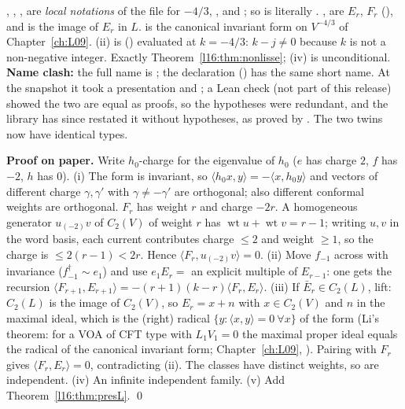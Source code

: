 \begin{dictionary}
, , ,  are \emph{local notations} of the file for $-4/3$, ,
\allowbreak{} and ; so \allowbreak{}\allowbreak{} is literally
. ,  are $E_r$, $F_r$
(), and  is the image of $E_r$ in $L$.  is the
canonical invariant form on $V^{-4/3}$ of Chapter~\ref{ch:L09}. (ii) is \allowbreak{}
() evaluated at $k=-4/3$: $k-j\ne0$ because $k$ is not a non-negative integer. Exactly
Theorem~\ref{l16:thm:nonlisse}; (iv) is unconditional. \textbf{Name clash:} the full name is
\allowbreak{}\allowbreak{}; the declaration \allowbreak{}\allowbreak{}
() has the same short name. At the snapshot it took a presentation  and
; a Lean check (not part of this release) showed the two are equal as proofs, so the hypotheses were redundant, and the
library has since restated it without hypotheses, as  proved by
. The two twins now have identical types.
\end{dictionary}

\textbf{Proof on paper.} Write $h_0$-charge for the eigenvalue of $h_0$ ($e$ has charge $2$, $f$ has $-2$, $h$ has $0$). (i) The
form is invariant, so $\langle h_0x,y\rangle = -\langle x,h_0y\rangle$ and vectors of different charge $\gamma,\gamma'$ with
$\gamma\ne-\gamma'$ are orthogonal; also different conformal weights are orthogonal. $F_r$ has weight $r$ and charge $-2r$. A
homogeneous generator $u_{(-2)}v$ of $C_2(V)$ of weight $r$ has $\operatorname{wt}u + \operatorname{wt}v = r-1$; writing $u,v$ in
the word basis, each current contributes charge $\le2$ and weight $\ge1$, so the charge is $\le2(r-1)<2r$. Hence
$\langle F_r,u_{(-2)}v\rangle = 0$. (ii) Move $f_{-1}$ across with invariance ($f_{-1}^\dagger\sim e_1$) and use
$e_1E_{r} = $ an explicit multiple of $E_{r-1}$: one gets the recursion $\langle F_{r+1},E_{r+1}\rangle =
-(r+1)(k-r)\langle F_r,E_r\rangle$. (iii) If $\bar E_r\in C_2(L)$, lift: $C_2(L)$ is the image of $C_2(V)$, so $E_r = x+n$ with $x\in
C_2(V)$ and $n$ in the maximal ideal, which is the (right) radical $\{y : \langle x,y\rangle = 0\ \forall x\}$ of the form (Li's theorem: for a VOA of CFT type with
$L_1V_1=0$ the maximal proper ideal equals the radical of the canonical invariant form; Chapter~\ref{ch:L09},
\allowbreak{}\allowbreak{}). Pairing
with $F_r$ gives $\langle F_r,E_r\rangle = 0$, contradicting (ii). The classes have distinct weights, so are independent. (iv)
An infinite independent family. (v) Add Theorem~\ref{l16:thm:presL}. \qed


